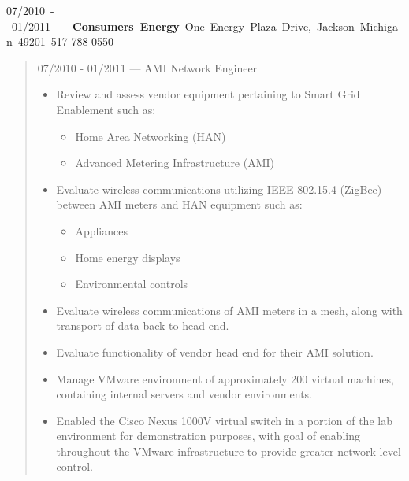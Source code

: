 \mbox{07/2010 - 01/2011 --- {\bf Consumers Energy} One Energy Plaza Drive, Jackson Michigan 49201 517-788-0550}
\begin{quote}
07/2010 - 01/2011 --- AMI Network Engineer\\
\begin{itemize}
\item Review and assess vendor equipment pertaining to Smart Grid Enablement
such as:
\begin{itemize}
\item Home Area Networking (HAN)
\item Advanced Metering Infrastructure (AMI)
\end{itemize}
\item Evaluate wireless communications utilizing IEEE 802.15.4 (ZigBee)
between AMI meters and HAN equipment such as:
\begin{itemize}
\item Appliances
\item Home energy displays
\item Environmental controls
\end{itemize}
\item Evaluate wireless communications of AMI meters in a mesh, along with
transport of data back to head end.
\item Evaluate functionality of vendor head end for their AMI solution.
\item Manage VMware environment of approximately 200 virtual machines,
containing internal servers and vendor environments.
\item Enabled the Cisco Nexus 1000V virtual switch in a portion of the lab
environment for demonstration purposes, with goal of enabling throughout
the VMware infrastructure to provide greater network level control.
\end{itemize}
\end{quote}
